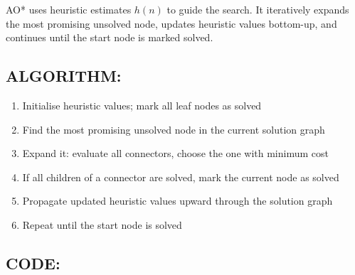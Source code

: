 \documentclass[12pt,a4paper]{article}
\begin{document}
AO* uses heuristic estimates $h(n)$ to guide the search. It iteratively expands the most promising unsolved node, updates heuristic values bottom-up, and continues until the start node is marked solved.

\subsection{ALGORITHM:}

\begin{enumerate}
    \item Initialise heuristic values; mark all leaf nodes as solved
    \item Find the most promising unsolved node in the current solution graph
    \item Expand it: evaluate all connectors, choose the one with minimum cost
    \item If all children of a connector are solved, mark the current node as solved
    \item Propagate updated heuristic values upward through the solution graph
    \item Repeat until the start node is solved
\end{enumerate}

\subsection{CODE:}
\end{document}
